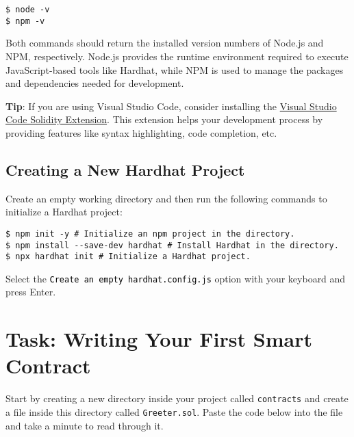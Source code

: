 \documentclass[12pt]{article}
\newcommand{\codegrey}[1]{%
  \texttt{\colorbox{black!4}{\textcolor{black}{#1}}}%
}
\begin{document}
\begin{verbatim}
$ node -v
$ npm -v
\end{verbatim}

\noindent
Both commands should return the installed version numbers of Node.js and NPM, respectively. Node.js provides the runtime environment required to execute JavaScript-based tools like Hardhat, while NPM is used to manage the packages and dependencies needed for development.

\medskip
\noindent
\textbf{Tip}: If you are using Visual Studio Code, consider installing the \href{https://marketplace.visualstudio.com/items?itemName=JuanBlanco.solidity}{Visual Studio Code Solidity Extension}. This extension helps your development process by providing features like syntax highlighting, code completion, etc.

\subsection{Creating a New Hardhat Project}

Create an empty working directory and then run the following commands to
initialize a Hardhat project:

\begin{verbatim}
$ npm init -y # Initialize an npm project in the directory.
$ npm install --save-dev hardhat # Install Hardhat in the directory.
$ npx hardhat init # Initialize a Hardhat project.
\end{verbatim}
Select the \codegrey{Create an empty hardhat.config.js} option with your keyboard
and press Enter.

\section{Task: Writing Your First Smart Contract}

Start by creating a new directory inside your project called \texttt{contracts}
and create a file inside this directory called \texttt{Greeter.sol}. Paste the
code below into the file and take a minute to read through it.
\end{document}
